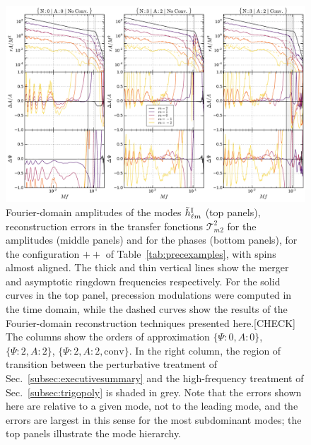 \documentclass[aps,showpacs,twocolumn,
prd,superscriptaddress,nofootinbib]{revtex4-1}
\newcommand\calT{{\mathcal{T}}}
\newcommand{\jgb}[1]{{\color{DarkGreen} #1}}
\begin{document}
\begin{figure}
  \centering
  \includegraphics[width=.98\linewidth]{plots/precerror_++_py.pdf}
  \caption{Fourier-domain amplitudes of the modes $\tilde{h}^{\rm I}_{\ell m}$ (top panels), reconstruction errors in the transfer fonctions $\calT^{2}_{m2}$ for the amplitudes (middle panels) and for the phases (bottom panels),  for the configuration $++$ of Table~\ref{tab:precexamples}, with spins almost aligned. The thick and thin vertical lines show the merger and asymptotic ringdown frequencies respectively.     \jgb{For the solid curves in the top panel, precession modulations were computed in the time domain, while the dashed curves show the results of the Fourier-domain reconstruction techniques presented here.[CHECK]}
The columns show the orders of approximation $\{\Psi:0,A:0\}$, $\{\Psi:2,A:2\}$, $\{\Psi:2,A:2,\text{conv}\}$. In the right column, the region of transition between the perturbative treatment of Sec.~\ref{subsec:executivesummary} and the high-frequency treatment of Sec.~\ref{subsec:trigopoly} is shaded in grey. Note that the errors shown here are relative to a given mode, not to the leading mode, and the errors are largest in this sense for the most subdominant modes; the top panels illustrate the mode hierarchy.}
  \label{fig:precerrors++}
\end{figure}
\end{document}
